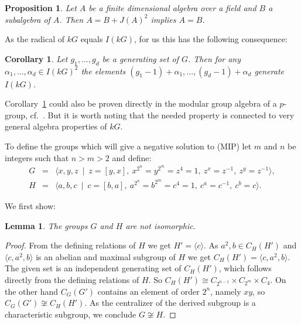 \documentclass[11pt, a4paper]{amsart}
\newtheorem{corollary}[theorem]{Corollary}
\newtheorem{lemma}[theorem]{Lemma}
\newtheorem{proposition}[theorem]{Proposition}
\theoremstyle{definition}
\begin{document}
\begin{proposition}\label{prop:AuslanderReitenSmalo}\cite[Proposition 5.2]{KuelshammerBook91} 
Let $A$ be a finite dimensional algebra over a field and $B$ a subalgebra of $A$. Then $A = B + J(A)^2$ implies $A = B$.
\end{proposition}

As the radical of $kG$ equals $I(kG)$, for us this has the following consequence:

\begin{corollary}\label{cor:GenModI2}
Let $g_1,...,g_d$ be a generating set of $G$. Then for any $\alpha_1,...,\alpha_d \in I(kG)^2$ the elements $(g_1 - 1) + \alpha_1,...,(g_d - 1) + \alpha_d$ generate $I(kG)$.
\end{corollary}


Corollary~\ref{cor:GenModI2} could also be proven directly in the modular group algebra of a $p$-group, cf.\ \cite[Section 2]{SalimSandlingSmallGroupRing}. But it is worth noting that the needed property is connected to very general algebra properties of $kG$. 

To define the groups which will give a negative solution to (MIP) let $m$ and $n$ be integers such that $n > m > 2$ and define:
\begin{eqnarray*}
G&=&\langle x,y,z \ \mid \ z=[y,x], \ x^{2^n}=y^{2^m}=z^4=1, \ z^x=z^{-1}, \ z^y=z^{-1} \rangle,	\\
H&=&\langle a,b,c \  \mid \ c=[b,a], \ a^{2^n}=b^{2^m}=c^4=1, \ c^a=c^{-1}, \ c^b=c \rangle.
\end{eqnarray*}

We first show:

\begin{lemma}\label{lem:HAndHNotIsom}
The groups $G$ and $H$ are not isomorphic.
\end{lemma}
\begin{proof}
From the defining relations of $H$ we get $H' = \langle c \rangle$. As $a^2, b \in C_H(H')$ and $\langle c, a^2, b \rangle$ is an abelian and maximal subgroup of $H$ we get $C_H(H') = \langle c, a^2, b \rangle$. The given set is an independent generating set of $C_H(H')$, which follows directly from the defining relations of $H$. So $C_H(H') \cong C_{2^{n-1}} \times C_{2^m} \times C_4$. On the other hand $C_G(G')$ contains an element of order $2^n$, namely $xy$, so $C_G(G') \not\cong C_H(H')$. As the centralizer of the derived subgroup is a characteristic subgroup, we conclude $G \not\cong H$.
\end{proof}
\end{document}
